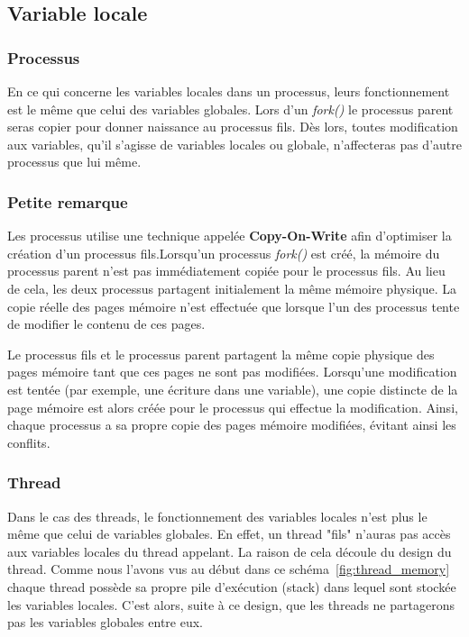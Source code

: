 \subsection{Variable locale}
\subsubsection{Processus}
En ce qui concerne les variables locales dans un processus, leurs fonctionnement est le même que celui des variables globales. Lors d'un \textit{fork()} le processus parent seras copier pour donner naissance au processus fils. Dès lors, toutes modification aux variables, qu'il s'agisse de variables locales ou globale, n'affecteras pas d'autre processus que lui même. 
\\

\subsubsection{Petite remarque}
Les processus utilise une technique appelée \textbf{Copy-On-Write} afin d'optimiser la création d'un processus fils.Lorsqu'un processus \textit{fork()} est créé, la mémoire du processus parent n'est pas immédiatement copiée pour le processus fils. Au lieu de cela, les deux processus partagent initialement la même mémoire physique. La copie réelle des pages mémoire n'est effectuée que lorsque l'un des processus tente de modifier le contenu de ces pages.

Le processus fils et le processus parent partagent la même copie physique des pages mémoire tant que ces pages ne sont pas modifiées. Lorsqu'une modification est tentée (par exemple, une écriture dans une variable), une copie distincte de la page mémoire est alors créée pour le processus qui effectue la modification. Ainsi, chaque processus a sa propre copie des pages mémoire modifiées, évitant ainsi les conflits.
\subsubsection{Thread}

Dans le cas des threads, le fonctionnement des variables locales n'est plus le même que celui de variables globales. En effet, un thread "fils" n'auras pas accès aux variables locales du thread appelant. La raison de cela découle du design du thread. Comme nous l'avons vus au début dans ce schéma~\ref{fig:thread_memory} chaque thread possède sa propre pile d'exécution (stack) dans lequel sont stockée les variables locales. C'est alors, suite à ce design, que les threads ne partagerons pas les variables globales entre eux.

